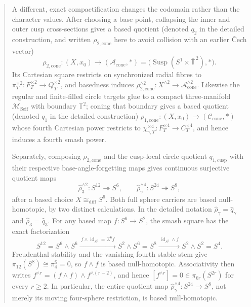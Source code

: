 \documentclass[11pt,letterpaper]{article}
\theoremstyle{definition}
\theoremstyle{remark}
\begin{document}
\begin{abstract}
 A different, exact compactification changes the codomain rather than the
 character values.  After choosing a base point, collapsing the inner and
 outer cusp cross-sections gives a based quotient (denoted \(q_2\) in the
 detailed construction, and written \(\rho_{2,\mathrm{cone}}\) here to avoid collision with
 an earlier \v Cech vector)
 \[
  \rho_{2,\mathrm{cone}}:(X,x_0)\longrightarrow
  (\mathcal A_{\mathrm{cone}},*)
  =\bigl(\operatorname{Susp}(S^1\times\overline{\mathbb T}^{\,2}),*\bigr).
 \]
 Its Cartesian square restricts on synchronized radial fibres to
 \(\pi_T^{\times2}:F_T^{\times2}\to Q_T^{\times2}\), and basedness induces
 \(\rho_{2,\mathrm{cone}}^{\wedge2}:X^{\wedge2}\to
 \mathcal A_{\mathrm{cone}}^{\wedge2}\).
 Likewise the regular and finite-filled circle targets glue to a compact
 three-manifold \(\mathcal M_{\mathrm{Seif}}\) with boundary
 \(\mathbb T^2\); coning that boundary gives a based quotient (denoted
 \(q_1\) in the detailed construction)
 \(\rho_{1,\mathrm{cone}}:(X,x_0)\to(\mathcal C_{\mathrm{cone}},*)\) whose fourth Cartesian
 power restricts to
 \(\chi_{\gamma,T}^{\times4}:F_T^{\times4}\to C_T^{\times4}\), and hence
 induces a fourth smash power.

 Separately, composing \(\rho_{2,\mathrm{cone}}\) and the cusp-local circle quotient
 \(q_{1,\mathrm{cusp}}\) with their respective base-angle-forgetting maps
 gives continuous surjective quotient maps
 \[
  \widehat\rho_3^{\wedge2}:S^{12}\twoheadrightarrow S^6,
  \qquad
  \widehat\rho_\gamma^{\wedge4}:S^{24}\twoheadrightarrow S^8,
 \]
 after a based choice \(X\cong_{\mathrm{diff}}S^6\).  Both full sphere
 carriers are based null-homotopic, by two distinct calculations.  In the
 detailed notation \(\widehat\rho_\gamma=\widehat q_\gamma\) and
 \(\widehat\rho_3=\widehat q_3\).  For any based map
 \(f:S^6\to S^2\), the smash square has the exact factorization
 \[
  S^{12}=S^6\wedge S^6
  \xrightarrow{\ f\wedge\operatorname{id}_{S^6}=\Sigma^6f\ }
  S^2\wedge S^6=S^8
  \xrightarrow{\ \operatorname{id}_{S^2}\wedge f\ }
  S^2\wedge S^2=S^4.
 \]
 Freudenthal stability and the vanishing fourth stable stem give
 \(\pi_{12}(S^8)\cong\pi_4^{\mathrm S}=0\), so \(f\wedge f\) is based
 null-homotopic.  Associativity then writes
 \(f^{\wedge r}=(f\wedge f)\wedge f^{\wedge(r-2)}\), and hence
 \([f^{\wedge r}]=0\in\pi_{6r}(S^{2r})\) for every \(r\ge2\).  In
 particular, the entire quotient map
 \(\widehat\rho_\gamma^{\wedge4}:S^{24}\to S^8\), not merely its moving
 four-sphere restriction, is based null-homotopic.


\end{abstract}
\end{document}
